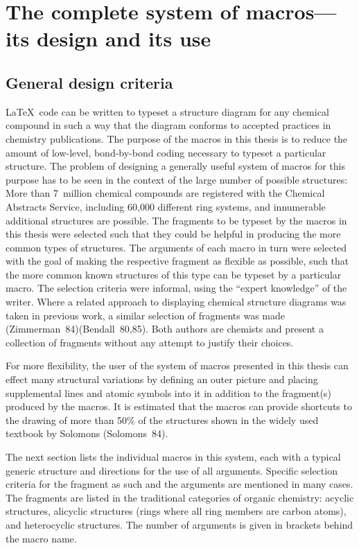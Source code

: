  \newcommand{\ri}{No action is taken for any other value of
 the argument}
 \chapter{The complete system of macros---its design and its use}
\label{ch:macros}
 \section{General design criteria}
 \LaTeX\  code can be written to typeset a structure diagram for any
 chemical compound in such a way that the diagram conforms to
 accepted practices in chemistry publications.  The purpose
 of the macros in this thesis is to reduce the amount of
 low-level, bond-by-bond coding necessary to typeset a particular
 structure.  The problem of designing a generally useful system
 of macros for this purpose has to be seen in the context
 of the large number of possible structures: More than 7~million
 chemical compounds are registered with the Chemical Abstracts
 Service, including 60,000 different ring systems, and
 innumerable additional structures are possible.
 The fragments to be typeset by the macros in this thesis were
 selected such that they could be helpful in producing the
 more common types of structures.  The arguments of each macro
 in turn were selected with the goal of making the respective
 fragment as flexible as possible, such that the more common
 known structures of this type can be typeset by a particular
 macro.  The selection criteria were informal, using the
 ``expert knowledge'' of the writer.  Where a related
 approach to displaying chemical structure diagrams was taken
 in previous work, a similar selection of fragments was made
 (Zimmerman~84)(Bendall~80,85). Both authors are chemists and
 present a collection of fragments without any attempt to
 justify their choices.
 
 For more flexibility, the user of the system of macros
 presented in this thesis can effect many structural
 variations by defining an outer picture
 and placing supplemental lines and atomic symbols into
 it in addition to the fragment(s) produced by the macros.
 It is estimated that the
 macros can provide shortcuts
 to the drawing of more than 50\% of the structures shown
 in the widely used textbook by Solomons (Solomons~84).
 
 The next section lists the individual macros in this system,
 each with a typical generic structure and directions for
 the use of all arguments.  Specific selection criteria for
 the fragment as such and the arguments are mentioned in
 many cases.  The fragments are listed in the traditional
 categories of organic chemistry: acyclic structures,
 alicyclic structures (rings where all ring members are
 carbon atoms), and heterocyclic structures.  The number
 of arguments is given in brackets behind the macro name.
 
